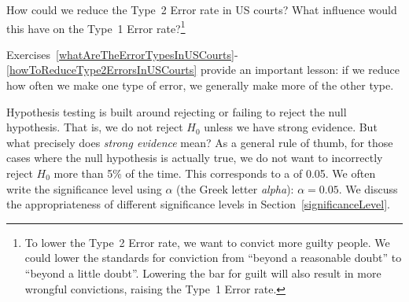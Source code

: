 \begin{exercise} \label{howToReduceType2ErrorsInUSCourts}
How could we reduce the Type~2 Error rate in US courts? What influence would this have on the Type~1 Error rate?\footnote{To lower the Type~2 Error rate, we want to convict more guilty people. We could lower the standards for conviction from ``beyond a reasonable doubt'' to ``beyond a little doubt''. Lowering the bar for guilt will also result in more wrongful convictions, raising the Type~1 Error rate.}
\end{exercise}


Exercises~\ref{whatAreTheErrorTypesInUSCourts}-\ref{howToReduceType2ErrorsInUSCourts} provide an important lesson: if we reduce how often we make one type of error, we generally make more of the other type.

Hypothesis testing is built around rejecting or failing to reject the null hypothesis. That is, we do not reject $H_0$ unless we have strong evidence. But what precisely does \emph{strong evidence} mean? As a general rule of thumb, for those cases where the null hypothesis is actually true, we do not want to incorrectly reject $H_0$ more than 5\% of the time. This corresponds to a  of 0.05. We often write the significance level using $\alpha$ (the Greek letter \emph{alpha}): $\alpha = 0.05$. We discuss the appropriateness of different significance levels in Section~\ref{significanceLevel}.


